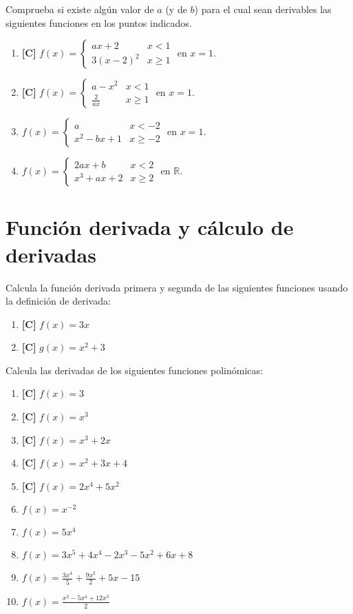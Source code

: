 \Exercicio Comprueba si existe algún valor de $a$ (y de $b$) para el cual sean derivables las siguientes funciones en los puntos indicados.
\begin{enumerate}[topsep=0pt]
	\item \textbf{[C]} $ f(x) = \left\{ \begin{array}{lc}
						 ax+2 & x < 1 \\
						 3(x-2)^2  & x \ge 1
						 \end{array}
	 					\right.$
	 					en $x=1$.
	\item \textbf{[C]} $ f(x) = \left\{ \begin{array}{lc}
						 a-x^2 & x < 1 \\
						 \frac{2}{ax}  & x \ge 1
						 \end{array}
	 					\right.$
	 					en $x=1$.
	 \item $ f(x) = \left\{ \begin{array}{lc}
		 	a & x < -2 \\
		 	x^2-bx+1  & x \ge -2
			\end{array}
			\right.$
		 	en $x=1$.
	 \item $ f(x) = \left\{ \begin{array}{lc}
			2ax +b & x < 2 \\
			x^3+ax+2  & x \ge 2
			\end{array}
			\right.$
			en $\mathbb{R}$.
			
\end{enumerate}


\section{Función derivada y cálculo de derivadas}

\Exercicio Calcula la función derivada primera y segunda de las siguientes funciones usando la definición de derivada:
\begin{enumerate}[topsep=0pt]
	\item \textbf{[C]} $f(x) = 3x$
	\item \textbf{[C]} $g(x) = x^2 + 3$
\end{enumerate}


\Exercicio  Calcula las derivadas de los siguientes funciones polinómicas:

\begin{enumerate}[topsep=0pt]
	\item \textbf{[C]} $ f(x) = 3$
	\item \textbf{[C]} $ f(x) = x^3 $
	\item \textbf{[C]} $ f(x) = x^3 + 2x $
	\item \textbf{[C]} $ f(x) = x^2 + 3x + 4 $
	\item \textbf{[C]} $ f(x) = 2x^4 + 5x^2 $
	\item $ f(x) =  x^{-2}$
	\item $ f(x) =  5x^4$
	\item $ f(x) =  3x^5 +4x^4 -2x^3 -5x^2 +6x +8$
	\item $ f(x) =  \frac{3x^4}{5} + \frac{9x^2}{2} + 5x -15$
	\item $ f(x) =  \frac{x^2-5x^4+12x^3}{2}$
\end{enumerate}


